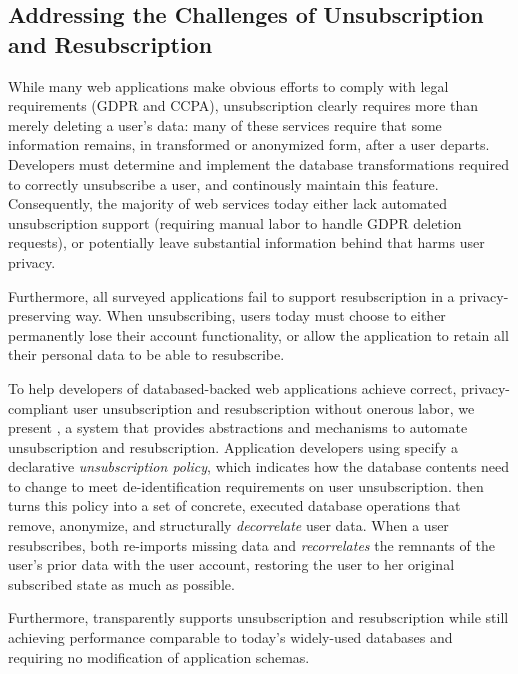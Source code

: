 \subsection{Addressing the Challenges of Unsubscription and Resubscription}

While many web applications make obvious efforts to comply with legal requirements (GDPR and CCPA), 
unsubscription clearly requires more than merely deleting a user's data: many of these services
require that some information remains, in transformed or anonymized form, after a user departs.
%
Developers must determine and implement the database transformations required to
correctly unsubscribe a user, and continously maintain this feature.
%
Consequently, the majority of web services today either lack automated unsubscription support
(requiring manual labor to handle \eg GDPR deletion requests), or potentially leave substantial
information behind that harms user privacy.

Furthermore, all surveyed applications fail to support resubscription in a privacy-preserving way.
When unsubscribing, users today must choose to either permanently lose their account functionality,
or allow the application to retain all their personal data to be able to resubscribe.

To help developers of databased-backed web applications achieve correct,
privacy-compliant user unsubscription and resubscription without onerous labor, we present 
\sys, a system that provides abstractions and mechanisms to automate unsubscription and
resubscription.
%
Application developers using \sys specify a declarative \emph{unsubscription policy},
which indicates how the database contents need to change to meet de-identification
requirements on user unsubscription.
%
\sys then turns this policy into a set of concrete, executed database operations that remove,
anonymize, and structurally \emph{decorrelate} user data.
%
When a user resubscribes, \sys both re-imports missing data and
\emph{recorrelates} the remnants of the user's prior data with the user account,
restoring the user to her original subscribed state as much as possible.

Furthermore, \sys transparently supports unsubscription and resubscription while still achieving performance
comparable to today’s widely-used databases and requiring no modification of application schemas.

